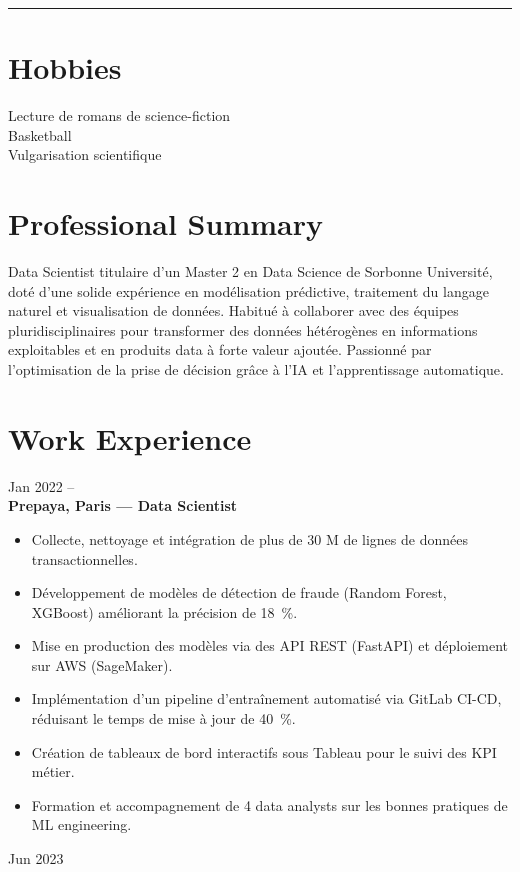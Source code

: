 \documentclass[10pt,letterpaper]{article}
\newcommand{\cvHr}{\vspace{0.5\baselineskip}\hrule height 1pt\color{primary}\vspace{0.7\baselineskip}}
\begin{document}
\begin{paracol}{2}
\begin{leftcolumn}
\cvHr
\section*{Hobbies}
Lecture de romans de science-fiction\\
Basketball\\
Vulgarisation scientifique
\end{leftcolumn}

\begin{rightcolumn}
\section*{Professional Summary}
Data Scientist titulaire d’un Master 2 en Data Science de Sorbonne Université, doté d’une solide expérience en modélisation prédictive, traitement du langage naturel et visualisation de données. Habitué à collaborer avec des équipes pluridisciplinaires pour transformer des données hétérogènes en informations exploitables et en produits data à forte valeur ajoutée. Passionné par l’optimisation de la prise de décision grâce à l’IA et l’apprentissage automatique.

\vspace{0.5in}
\section*{Work Experience}

\begin{tcolorbox}
  \begin{minipage}[t]{0.48\linewidth}
    Jan 2022 --\\
    \textbf{Prepaya, Paris — Data Scientist}\\
    \begin{itemize}
      \item Collecte, nettoyage et intégration de plus de 30 M de lignes de données transactionnelles.
      \item Développement de modèles de détection de fraude (Random Forest, XGBoost) améliorant la précision de 18~\%.
      \item Mise en production des modèles via des API REST (FastAPI) et déploiement sur AWS (SageMaker).
      \item Implémentation d’un pipeline d’entraînement automatisé via GitLab CI-CD, réduisant le temps de mise à jour de 40~\%.
      \item Création de tableaux de bord interactifs sous Tableau pour le suivi des KPI métier.
      \item Formation et accompagnement de 4 data analysts sur les bonnes pratiques de ML engineering.
    \end{itemize}
  \end{minipage}\hfill
  \begin{minipage}[t]{0.48\linewidth}\raggedleft
    Jun 2023
  \end{minipage}
\end{tcolorbox}


\end{rightcolumn}
\end{paracol}
\end{document}

